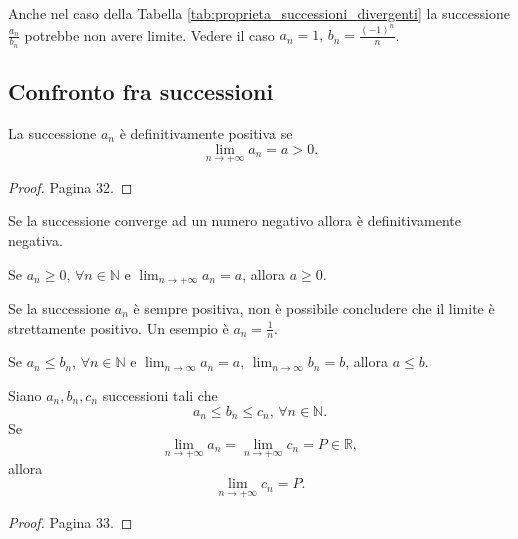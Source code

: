 \begin{remark}
    Anche nel caso della Tabella \ref{tab:proprieta_successioni_divergenti} la successione $\frac{a_n}{b_n}$ potrebbe non avere limite. Vedere il caso $a_n=1,\, b_n=\frac{(-1)^n}{n}$.
\end{remark}

\subsection{Confronto fra successioni}
\begin{theorem}
    La successione $a_n$ è definitivamente positiva se
    \begin{equation*}
        \lim_{n\rightarrow +\infty}a_n=a>0.
    \end{equation*}
\end{theorem}
\begin{proof}
    Pagina 32.
\end{proof}

Se la successione converge ad un numero negativo allora è definitivamente negativa.

\begin{corollary}
    Se $a_n\geq 0,\,\forall n\in\mathbb N$ e $\lim_{n\rightarrow +\infty}a_n=a$, allora $a\geq 0$.
\end{corollary}

\begin{remark}
    Se la successione $a_n$ è sempre positiva, non è possibile concludere che il limite è strettamente positivo. Un esempio è $a_n=\frac{1}{n}$.
\end{remark}

\begin{corollary}
    Se $a_n\leq b_n,\,\forall n\in\mathbb N$ e $\lim_{n\rightarrow\infty}a_n=a,\, \lim_{n\rightarrow\infty}b_n=b$, allora $a\leq b$.
\end{corollary}

\begin{theorem}\label{th:th:dei_carabinieri_2_1}
    Siano $a_n,b_n,c_n$ successioni tali che
    \begin{equation*}
        a_n\leq b_n\leq c_n,\,\forall n\in\mathbb N.
    \end{equation*}
    Se
    \begin{equation*}
        \lim_{n\rightarrow+\infty}a_n=\lim_{n\rightarrow+\infty}c_n=P\in\mathbb R,
    \end{equation*}
    allora
    \begin{equation*}
        \lim_{n\rightarrow+\infty}c_n=P.
    \end{equation*}
\end{theorem}
\begin{proof}
    Pagina 33.
\end{proof}

